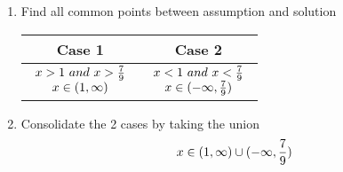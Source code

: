 \begin{enumerate}
	\item
	      Find all common points between assumption and solution \\
	      \begin{table}[H]
		      \centering
		      \begin{tabular}{|c|c|} \hline
			      \textbf{Case 1} & \textbf{Case 2}                \\ \hline
			      $ \begin{array}{ccc} x > 1 \ and \ x > {7 \over 9} \\ x \in (1, \infty) \end{array} $
			                      & $ \begin{array}{ccc} x < 1 \ and \ x < {7 \over 9} \\ x \in (-\infty, {7 \over 9}) \end{array} $ \\ \hline
		      \end{tabular}
	      \end{table}

	\item
	      Consolidate the 2 cases by taking the union \\
	      $$
		      x \in (1, \infty) \cup (-\infty, {7 \over 9})
	      $$
\end{enumerate}

